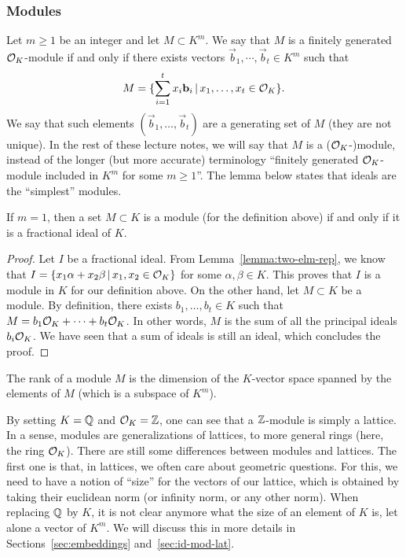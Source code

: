 \subsubsection{Modules}
\label{sec:modules}
Let $m \geq 1$ be an integer and let $M \subset K^m$. We say that $M$ is a finitely generated $\mathcal{O}_K$-module if and only if there exists vectors $\vec b_1, \cdots, \vec b_t \in K^m$ such that
\[ M = \{ \sum_{i = 1}^t x_i \mathbf b_i \,|\, x_1, \dots, x_t \in \mathcal{O}_K\}. \]
We say that such elements $(\vec b_1, \dots, \vec b_t)$ are a generating set of $M$ (they are not unique).
In the rest of these lecture notes, we will say that $M$ is a ($\mathcal{O}_K$-)module, instead of the longer (but more accurate) terminology ``finitely generated $\mathcal{O}_K$-module included in $K^m$ for some $m \geq 1$''.
The lemma below states that ideals are the ``simplest'' modules.

\begin{lemma}
If $m = 1$, then a set $M \subset K$ is a module (for the definition above) if and only if it is a fractional ideal of $K$.
\end{lemma}

\begin{proof}
Let $I$ be a fractional ideal. From Lemma~\ref{lemma:two-elm-rep}, we know that $I = \{ x_1 \alpha + x_2 \beta \,|\, x_1, x_2 \in \mathcal{O}_K\}$ for some $\alpha, \beta \in K$. This proves that $I$ is a module in $K$ for our definition above.
On the other hand, let $M \subset K$ be a module. By definition, there exists $b_1, \dots, b_t \in K$ such that $M = b_1 \mathcal{O}_K + \dots + b_t \mathcal{O}_K$. In other words, $M$ is the sum of all the principal ideals $b_i \mathcal{O}_K$. We have seen that a sum of ideals is still an ideal, which concludes the proof.
\end{proof}

\begin{definition}
The rank of a module $M$ is the dimension of the $K$-vector space spanned by the elements of $M$ (which is a subspace of $K^m$).
\end{definition}

By setting $K = \mathbb{Q}$ and $\mathcal{O}_K = \mathbb{Z}$, one can see that a $\mathbb{Z}$-module is simply a lattice. In a sense, modules are generalizations of lattices, to more general rings (here, the ring $\mathcal{O}_K$). There are still some differences between modules and lattices. The first one is that, in lattices, we often care about geometric questions. For this, we need to have a notion of ``size'' for the vectors of our lattice, which is obtained by taking their euclidean norm (or infinity norm, or any other norm). When replacing $\mathbb{Q}$ by $K$, it is not clear anymore what the size of an element of $K$ is, let alone a vector of $K^m$. We will discuss this in more details in Sections~\ref{sec:embeddings} and~\ref{sec:id-mod-lat}.

